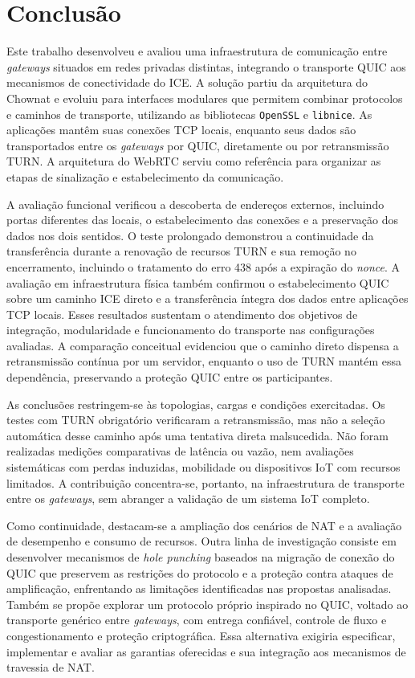 \chapter{Conclusão}
\label{chap:conclusion}

Este trabalho desenvolveu e avaliou uma infraestrutura de comunicação entre \textit{gateways} situados em redes privadas distintas, integrando o transporte QUIC aos mecanismos de conectividade do ICE. A solução partiu da arquitetura do Chownat e evoluiu para interfaces modulares que permitem combinar protocolos e caminhos de transporte, utilizando as bibliotecas \texttt{OpenSSL} e \texttt{libnice}. As aplicações mantêm suas conexões TCP locais, enquanto seus dados são transportados entre os \textit{gateways} por QUIC, diretamente ou por retransmissão TURN. A arquitetura do WebRTC serviu como referência para organizar as etapas de sinalização e estabelecimento da comunicação.

A avaliação funcional verificou a descoberta de endereços externos, incluindo portas diferentes das locais, o estabelecimento das conexões e a preservação dos dados nos dois sentidos. O teste prolongado demonstrou a continuidade da transferência durante a renovação de recursos TURN e sua remoção no encerramento, incluindo o tratamento do erro 438 após a expiração do \textit{nonce}. A avaliação em infraestrutura física também confirmou o estabelecimento QUIC sobre um caminho ICE direto e a transferência íntegra dos dados entre aplicações TCP locais. Esses resultados sustentam o atendimento dos objetivos de integração, modularidade e funcionamento do transporte nas configurações avaliadas. A comparação conceitual evidenciou que o caminho direto dispensa a retransmissão contínua por um servidor, enquanto o uso de TURN mantém essa dependência, preservando a proteção QUIC entre os participantes.

As conclusões restringem-se às topologias, cargas e condições exercitadas. Os testes com TURN obrigatório verificaram a retransmissão, mas não a seleção automática desse caminho após uma tentativa direta malsucedida. Não foram realizadas medições comparativas de latência ou vazão, nem avaliações sistemáticas com perdas induzidas, mobilidade ou dispositivos IoT com recursos limitados. A contribuição concentra-se, portanto, na infraestrutura de transporte entre os \textit{gateways}, sem abranger a validação de um sistema IoT completo.

Como continuidade, destacam-se a ampliação dos cenários de NAT e a avaliação de desempenho e consumo de recursos. Outra linha de investigação consiste em desenvolver mecanismos de \textit{hole punching} baseados na migração de conexão do QUIC que preservem as restrições do protocolo e a proteção contra ataques de amplificação, enfrentando as limitações identificadas nas propostas analisadas. Também se propõe explorar um protocolo próprio inspirado no QUIC, voltado ao transporte genérico entre \textit{gateways}, com entrega confiável, controle de fluxo e congestionamento e proteção criptográfica. Essa alternativa exigiria especificar, implementar e avaliar as garantias oferecidas e sua integração aos mecanismos de travessia de NAT.